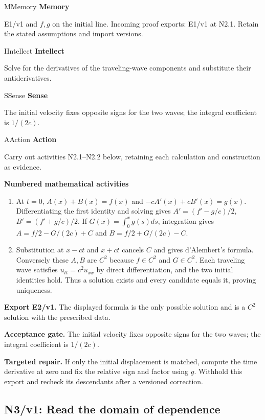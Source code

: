 \documentclass[preprint,12pt,aps,pra,showkeys,amsmath,amssymb,superscriptaddress,floatfix]{revtex4-2}
\theoremstyle{definition}
\theoremstyle{remark}
\newcommand{\mmfaculty}[3]{%
 \begin{mmfacultybox}{#1}{#2}
 {\sffamily\bfseries\color{MMBlue}#2}\par\smallskip #3
 \end{mmfacultybox}}
\newcommand{\field}[2]{\par\smallskip\noindent\textbf{#1.} #2\par}
\begin{document}
\mmfaculty{M}{Memory}{E1/v1 and \(f,g\) on the initial line. Incoming proof exports: E1/v1 at
N2.1. Retain the stated assumptions and import versions.}

\mmfaculty{I}{Intellect}{Solve for the derivatives of the traveling-wave components and
substitute their antiderivatives.}

\mmfaculty{S}{Sense}{The initial velocity fixes opposite signs for the two waves; the
integral coefficient is \(1/(2c)\).}

\mmfaculty{A}{Action}{Carry out activities N2.1--N2.2 below, retaining each calculation and
construction as evidence.}

\smallskip\noindent\textbf{Numbered mathematical activities}

\begin{enumerate}[label=N2.\arabic*,leftmargin=3.4em]

\item At \(t=0\), \(A(x)+B(x)=f(x)\) and \(-cA'(x)+cB'(x)=g(x)\).
Differentiating the first identity and solving gives \(A'=(f'-g/c)/2\),
\(B'=(f'+g/c)/2\). If \(G(x)=\int_0^x g(s)ds\), integration gives
\(A=f/2-G/(2c)+C\) and \(B=f/2+G/(2c)-C\).

\item Substitution at \(x-ct\) and \(x+ct\) cancels \(C\) and gives
d'Alembert's formula. Conversely these \(A,B\) are \(C^2\) because
\(f\in C^2\) and \(G\in C^2\). Each traveling wave satisfies
\(u_{tt}=c^2u_{xx}\) by direct differentiation, and the two initial
identities hold. Thus a solution exists and every candidate equals it,
proving uniqueness.

\end{enumerate}

\field{Export E2/v1}{The displayed formula is the only possible solution and is a \(C^2\)
solution with the prescribed data.}

\field{Acceptance gate}{The initial velocity fixes opposite signs for the two waves; the
integral coefficient is \(1/(2c)\).}

\field{Targeted repair}{If only the initial displacement is matched, compute the time derivative
at zero and fix the relative sign and factor using \(g\). Withhold this
export and recheck its descendants after a versioned correction.}

\clearpage

\subsection{N3/v1: Read the domain of dependence}
\end{document}
